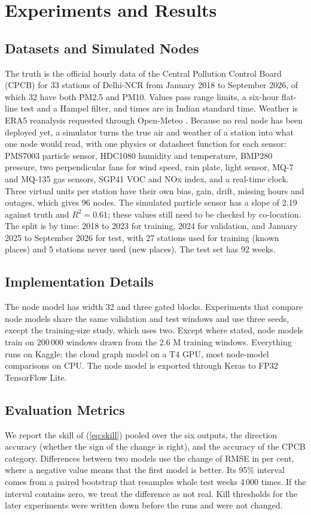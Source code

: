 \documentclass[journal]{IEEEtran}
\begin{document}
\section{Experiments and Results}
\label{sec:exp}
\subsection{Datasets and Simulated Nodes}
The truth is the official hourly data of the Central Pollution Control Board (CPCB) for 33 stations of Delhi-NCR from January 2018 to September 2026, of which 32 have both PM2.5 and PM10. Values pass range limits, a six-hour flat-line test and a Hampel filter, and times are in Indian standard time. Weather is ERA5 reanalysis requested through Open-Meteo \cite{hersbach2020era5}. Because no real node has been deployed yet, a simulator turns the true air and weather of a station into what one node would read, with one physics or datasheet function for each sensor: PMS7003 particle sensor, HDC1080 humidity and temperature, BMP280 pressure, two perpendicular fans for wind speed, rain plate, light sensor, MQ-7 and MQ-135 gas sensors, SGP41 VOC and NOx index, and a real-time clock. Three virtual units per station have their own bias, gain, drift, missing hours and outages, which gives 96 nodes. The simulated particle sensor has a slope of 2.19 against truth and $R^2=0.61$; these values still need to be checked by co-location. The split is by time: 2018 to 2023 for training, 2024 for validation, and January 2025 to September 2026 for test, with 27 stations used for training (known places) and 5 stations never used (new places). The test set has 92 weeks.

\subsection{Implementation Details}
The node model has width 32 and three gated blocks. Experiments that compare node models share the same validation and test windows and use three seeds, except the training-size study, which uses two. Except where stated, node models train on 200\,000 windows drawn from the 2.6 M training windows. Everything runs on Kaggle: the cloud graph model on a T4 GPU, most node-model comparisons on CPU. The node model is exported through Keras to FP32 TensorFlow Lite.

\subsection{Evaluation Metrics}
We report the skill of (\ref{eq:skill}) pooled over the six outputs, the direction accuracy (whether the sign of the change is right), and the accuracy of the CPCB category. Differences between two models use the change of RMSE in per cent, where a negative value means that the first model is better. Its 95\% interval comes from a paired bootstrap that resamples whole test weeks 4\,000 times. If the interval contains zero, we treat the difference as not real. Kill thresholds for the later experiments were written down before the runs and were not changed.
\end{document}
